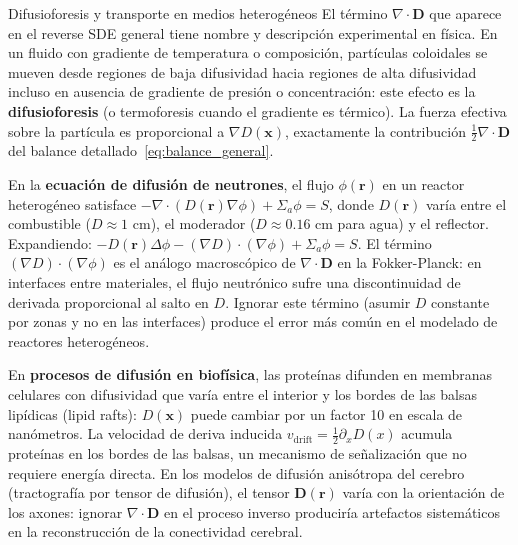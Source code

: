 \begin{fisicaconexion}{Difusioforesis y transporte en medios heterogéneos}
El término $\nabla\cdot\bm{D}$ que aparece en el reverse SDE general tiene
nombre y descripción experimental en física. En un fluido con gradiente de
temperatura o composición, partículas coloidales se mueven desde regiones de
baja difusividad hacia regiones de alta difusividad incluso en ausencia de
gradiente de presión o concentración: este efecto es la
\textbf{difusioforesis} (o termoforesis cuando el gradiente es térmico). La
fuerza efectiva sobre la partícula es proporcional a $\nabla D(\bm{x})$,
exactamente la contribución $\frac{1}{2}\nabla\cdot\bm{D}$ del balance
detallado~\eqref{eq:balance_general}.

En la \textbf{ecuación de difusión de neutrones}, el flujo $\phi(\bm{r})$ en
un reactor heterogéneo satisface $-\nabla\cdot(D(\bm{r})\nabla\phi) + \Sigma_a\phi
= S$, donde $D(\bm{r})$ varía entre el combustible ($D \approx 1$ cm), el
moderador ($D \approx 0.16$ cm para agua) y el reflector. Expandiendo:
$-D(\bm{r})\Delta\phi - (\nabla D)\cdot(\nabla\phi) + \Sigma_a\phi = S$.
El término $(\nabla D)\cdot(\nabla\phi)$ es el análogo macroscópico de
$\nabla\cdot\bm{D}$ en la Fokker-Planck: en interfaces entre materiales, el
flujo neutrónico sufre una discontinuidad de derivada proporcional al salto
en $D$. Ignorar este término (asumir $D$ constante por zonas y no en las
interfaces) produce el error más común en el modelado de reactores heterogéneos.

En \textbf{procesos de difusión en biofísica}, las proteínas difunden en
membranas celulares con difusividad que varía entre el interior y los bordes de
las balsas lipídicas (lipid rafts): $D(\bm{x})$ puede cambiar por un factor
10 en escala de nanómetros. La velocidad de deriva inducida $v_{\mathrm{drift}}
= \frac{1}{2}\partial_x D(x)$ acumula proteínas en los bordes de las balsas,
un mecanismo de señalización que no requiere energía directa. En los
modelos de difusión anisótropa del cerebro (tractografía por tensor de difusión),
el tensor $\bm{D}(\bm{r})$ varía con la orientación de los axones: ignorar
$\nabla\cdot\bm{D}$ en el proceso inverso produciría artefactos sistemáticos en
la reconstrucción de la conectividad cerebral.
\end{fisicaconexion}
\label{subsec:anderson_casos}

